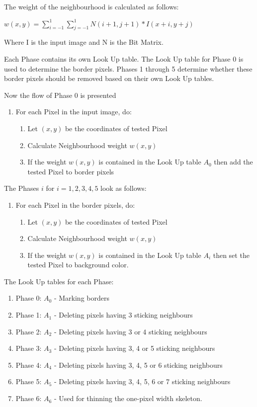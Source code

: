 \documentclass{article}
\begin{document}
The weight of the neighbourhood is calculated as follows:
\begin{center}
$w(x,y) = \sum^{1}_{i=-1} \sum^{1}_{j=-1} N(i+1,j+1)*I(x+i, y+j)$
\end{center}
Where I is the input image and N is the Bit Matrix.

Each Phase contains its own Look Up table. The Look Up table for Phase 0 is used to determine the border pixels. Phases 1 through 5 determine whether these border pixels should be removed based on their own Look Up tables.

Now the flow of Phase 0 is presented
\begin{enumerate}
	\item For each Pixel in the input image, do:
	\begin{enumerate}
		\item Let $(x,y)$ be the coordinates of tested Pixel
		\item Calculate Neighbourhood weight $w(x,y)$
		\item If the weight $w(x,y)$ is contained in the Look Up table $A_0$ then add the tested Pixel to border pixels
	\end{enumerate}	
\end{enumerate}

The Phases $i$ for $i = 1,2,3,4,5$ look as follows:
\begin{enumerate}
	\item For each Pixel in the border pixels, do:
	\begin{enumerate}
		\item Let $(x,y)$ be the coordinates of tested Pixel
		\item Calculate Neighbourhood weight $w(x,y)$
		\item If the weight $w(x,y)$ is contained in the Look Up table $A_i$ then set the tested Pixel to background color.
	\end{enumerate}	
\end{enumerate}

The Look Up tables for each Phase:
\begin{enumerate}
	\item Phase 0: $A_0$ - Marking borders
	\item Phase 1: $A_1$ - Deleting pixels having 3 sticking neighbours
	\item Phase 2: $A_2$ - Deleting pixels having 3 or 4 sticking neighbours
	\item Phase 3: $A_3$ - Deleting pixels having 3, 4 or 5 sticking neighbours
	\item Phase 4: $A_4$ - Deleting pixels having 3, 4, 5 or 6 sticking neighbours
	\item Phase 5: $A_5$ - Deleting pixels having 3, 4, 5, 6 or 7 sticking neighbours
	\item Phase 6: $A_6$ - Used for thinning the one-pixel width skeleton.
				
\end{enumerate}
\end{document}
